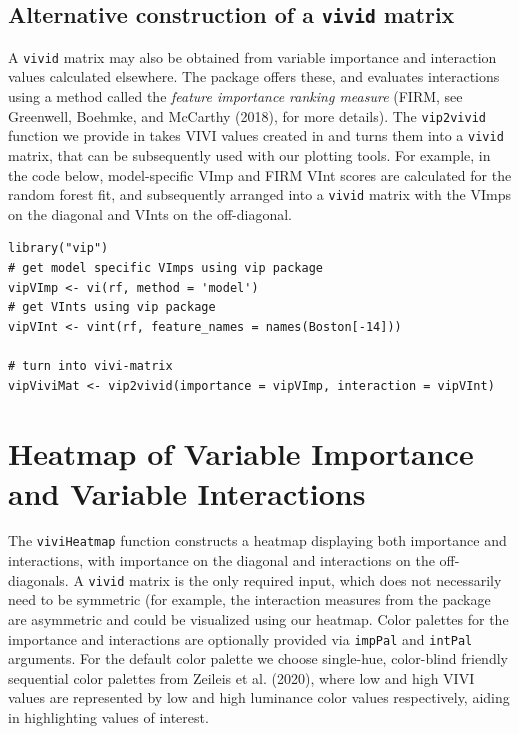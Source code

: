 \hypertarget{sec:vip2vivid}{%
\subsection{\texorpdfstring{Alternative construction of a \texttt{vivid} matrix}{Alternative construction of a vivid matrix}}\label{sec:vip2vivid}}

A \texttt{vivid} matrix may also be obtained from variable importance and interaction values calculated elsewhere. The package  offers these, and evaluates interactions using a method called the \emph{feature importance ranking measure} (FIRM, see Greenwell, Boehmke, and McCarthy (2018), for more details). The \texttt{vip2vivid} function we provide in  takes VIVI values created in  and turns them into a \texttt{vivid} matrix, that can be subsequently used with our plotting tools. For example, in the code below, model-specific VImp and FIRM VInt scores are calculated for the random forest fit, and subsequently arranged into a \texttt{vivid} matrix with the VImps on the diagonal and VInts on the off-diagonal.

\begin{verbatim}
library("vip")
# get model specific VImps using vip package
vipVImp <- vi(rf, method = 'model')
# get VInts using vip package
vipVInt <- vint(rf, feature_names = names(Boston[-14]))

# turn into vivi-matrix
vipViviMat <- vip2vivid(importance = vipVImp, interaction = vipVInt)
\end{verbatim}

\hypertarget{sec:heatmapSec}{%
\section{Heatmap of Variable Importance and Variable Interactions}\label{sec:heatmapSec}}

The \texttt{viviHeatmap} function constructs a heatmap displaying both importance and interactions, with importance on the diagonal and interactions on the off-diagonals. A \texttt{vivid} matrix is the only required input, which does not necessarily need to be symmetric (for example, the interaction measures from the  package are asymmetric and could be visualized using our heatmap. Color palettes for the importance and interactions are optionally provided via \texttt{impPal} and \texttt{intPal} arguments.
For the default color palette we choose single-hue, color-blind friendly sequential color palettes from Zeileis et al. (2020), where low and high VIVI values are represented by low and high luminance color values respectively, aiding in highlighting values of interest.

